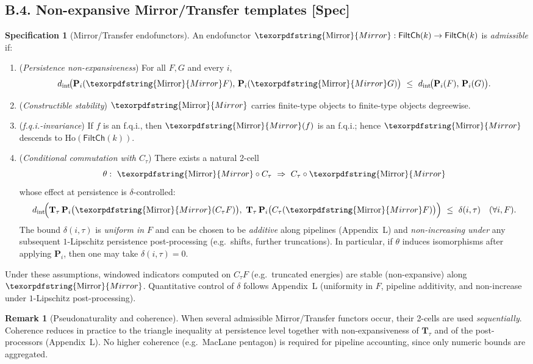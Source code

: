 \documentclass[11pt]{article}
\numberwithin{equation}{section}
\theoremstyle{plain}
\theoremstyle{definition}
\theoremstyle{remark}
\DeclareRobustCommand{\hyp}{\nobreakdash-}
\newcommand{\Ho}{\mathrm{Ho}}
\theoremstyle{plain}
\theoremstyle{definition}
\numberwithin{equation}{section}
\theoremstyle{definition}
\newtheorem{remark}[theorem]{Remark}
\newtheorem{specification}[theorem]{Specification}
\DeclareRobustCommand{\Mirror}{\texorpdfstring{\ensuremath{\operatorname{Mirror}}}{Mirror}}
\numberwithin{equation}{section}
\theoremstyle{plain}
\theoremstyle{definition}
\theoremstyle{remark}
\begin{document}
\subsection*{B.4. Non-expansive Mirror/Transfer templates \texorpdfstring{[Spec]}{[Spec]}}
\begin{specification}[Mirror/Transfer endofunctors]\label{B:spec:mirror}
An endofunctor \(\Mirror:\mathsf{FiltCh}(k)\to \mathsf{FiltCh}(k)\) is \emph{admissible} if:
\begin{enumerate}\itemsep0.2em
  \item (\emph{Persistence non-expansiveness})
  For all \(F,G\) and every \(i\),
  \[
  d_{\mathrm{int}}\!\big(\mathbf{P}_i(\Mirror F),\,\mathbf{P}_i(\Mirror G)\big)\ \le\ d_{\mathrm{int}}\!\big(\mathbf{P}_i(F),\,\mathbf{P}_i(G)\big).
  \]
  \item (\emph{Constructible stability})
  \(\Mirror\) carries finite-type objects to finite-type objects degreewise.
  \item (\emph{f.q.i.-invariance})
  If \(f\) is an f.q.i., then \(\Mirror(f)\) is an f.q.i.; hence \(\Mirror\) descends to \(\Ho(\mathsf{FiltCh}(k))\).
  \item (\emph{Conditional commutation with \(C_\tau\)})
  There exists a natural 2-cell
  \[
  \theta:\ \Mirror\circ C_\tau\ \Rightarrow\ C_\tau\circ \Mirror
  \]
  whose effect at persistence is \(\delta\)-controlled:
  \[
  d_{\mathrm{int}}\!\Big(\mathbf{T}_\tau\,\mathbf{P}_i\big(\Mirror(C_\tau F)\big),\ \mathbf{T}_\tau\,\mathbf{P}_i\big(C_\tau(\Mirror F)\big)\Big)\ \le\ \delta(i,\tau)\quad(\forall i,F).
  \]
  The bound \(\delta(i,\tau)\) is \emph{uniform in \(F\)} and can be chosen to be \emph{additive} along pipelines (Appendix~L) and \emph{non-increasing under} any subsequent \(1\)\hyp Lipschitz persistence post\hyp processing (e.g.\ shifts, further truncations).
  In particular, if \(\theta\) induces isomorphisms after applying \(\mathbf{P}_i\), then one may take \(\delta(i,\tau)=0\).
\end{enumerate}
Under these assumptions, windowed indicators computed on \(C_\tau F\) (e.g.\ truncated energies) are stable (non-expansive) along \(\Mirror\).
Quantitative control of \(\delta\) follows Appendix~L (uniformity in \(F\), pipeline additivity, and non-increase under \(1\)\hyp Lipschitz post\hyp processing).
\end{specification}

\begin{remark}[Pseudonaturality and coherence]
When several admissible Mirror/Transfer functors occur, their 2-cells are used \emph{sequentially}. Coherence reduces in practice to the triangle inequality at persistence level together with non-expansiveness of \(\mathbf{T}_\tau\) and of the post-processors (Appendix~L). No higher coherence (e.g.\ MacLane pentagon) is required for pipeline accounting, since only numeric bounds are aggregated.
\end{remark}
\end{document}
